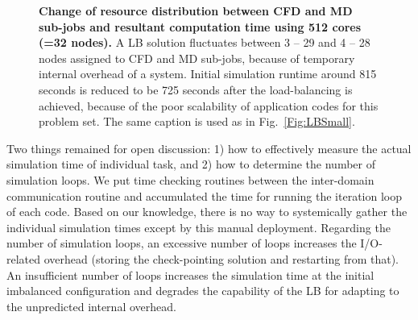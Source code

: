 \documentclass[preprint,12pt]{elsarticle}
\begin{document}
\begin{figure}
\centering
{}
\hskip 1cm
\vskip-0.2cm
\caption[]{\small {\bf Change of resource distribution between CFD and MD sub-jobs and resultant computation time using 512 cores (=32 nodes).} A LB solution fluctuates between 3 -- 29 and 4 -- 28 nodes assigned to CFD and MD sub-jobs, because of temporary internal overhead of a system. Initial simulation runtime around 815 seconds is reduced to be 725 seconds after the load-balancing is achieved, because of the poor scalability of application codes for this problem set. The same caption is used as in Fig.~\ref{Fig:LBSmall}.
}
\label{Fig:LBLarge}
\end{figure}


Two things remained for open discussion: 1) how to effectively measure the actual simulation time of individual task, and 2) how to determine the number of simulation loops. We put time checking routines between the inter-domain communication routine and accumulated the time for running the iteration loop of each code. Based on our knowledge, there is no way to systemically gather the individual simulation times except by this manual deployment. Regarding the number of simulation loops, an excessive number of loops increases the I/O-related overhead (storing the check-pointing solution and restarting from that). An insufficient number of loops increases the simulation time at the initial imbalanced configuration and degrades the capability of the LB for adapting to the unpredicted internal overhead.
\end{document}

